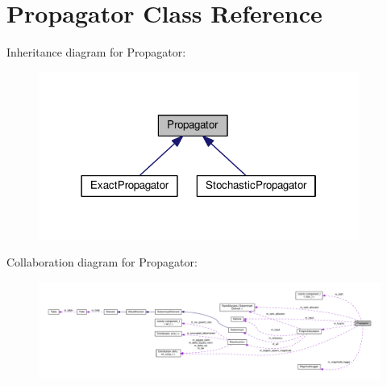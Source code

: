 \hypertarget{classPropagator}{}\section{Propagator Class Reference}
\label{classPropagator}


Inheritance diagram for Propagator\+:\nopagebreak
\begin{figure}[H]
\begin{center}
\leavevmode
\includegraphics[width=298pt]{classPropagator__inherit__graph}
\end{center}
\end{figure}


Collaboration diagram for Propagator\+:\nopagebreak
\begin{figure}[H]
\begin{center}
\leavevmode
\includegraphics[width=350pt]{classPropagator__coll__graph}
\end{center}
\end{figure}
